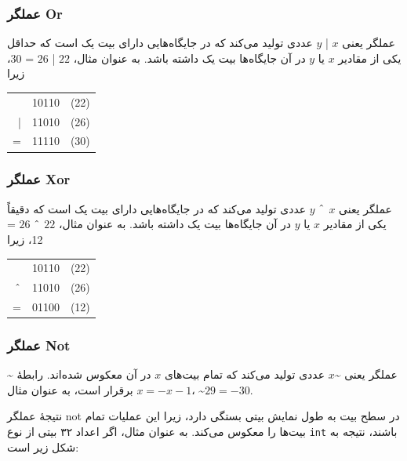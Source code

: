 \subsubsection{عملگر Or}


عملگر  یعنی $x$ | $y$ عددی تولید می‌کند
که در جایگاه‌هایی دارای بیت یک است که حداقل یکی
از مقادیر $x$ یا $y$ در آن جایگاه‌ها بیت یک داشته باشد.
به عنوان مثال، $22$ | $26$ = 30، زیرا

\begin{center}
\begin{tabular}{rrr}
& 10110 & (22)\\
| & 11010 & (26) \\
\hline
 = & 11110 & (30) \\
\end{tabular}
\end{center}

\subsubsection{عملگر Xor}


عملگر  یعنی $x$ $\XOR$ $y$ عددی تولید می‌کند
که در جایگاه‌هایی دارای بیت یک است که دقیقاً یکی
از مقادیر $x$ یا $y$ در آن جایگاه‌ها بیت یک داشته باشد.
به عنوان مثال، $22$ $\XOR$ $26$ = 12، زیرا

\begin{center}
\begin{tabular}{rrr}
& 10110 & (22)\\
$\XOR$ & 11010 & (26) \\
\hline
 = & 01100 & (12) \\
\end{tabular}
\end{center}

\subsubsection{عملگر Not}


عملگر  یعنی \textasciitilde$x$
عددی تولید می‌کند که تمام بیت‌های $x$
در آن معکوس شده‌اند.
رابطهٔ \textasciitilde$x = -x-1$ برقرار است،
به عنوان مثال، \textasciitilde$29 = -30$.

نتیجهٔ عملگر not در سطح بیت به طول نمایش بیتی بستگی دارد،
زیرا این عملیات تمام بیت‌ها را معکوس می‌کند.
به عنوان مثال، اگر اعداد ۳۲ بیتی از نوع
\texttt{int} باشند، نتیجه به شکل زیر است:

